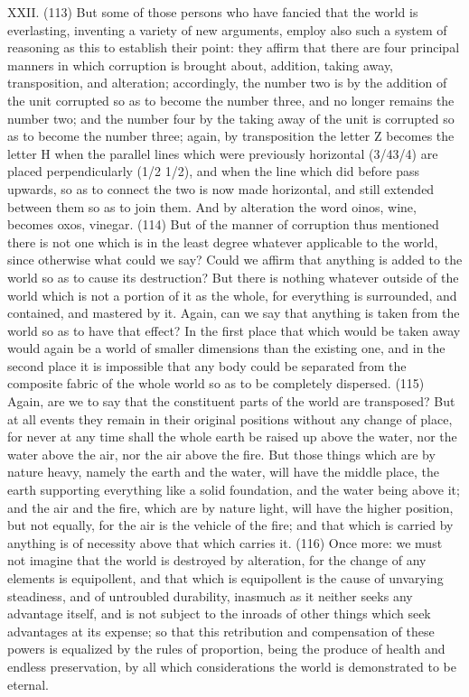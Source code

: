 XXII. (113) But some of those persons who have fancied that the world is everlasting, inventing a
variety of new arguments, employ also such a system of reasoning as this to establish their point:
they affirm that there are four principal manners in which corruption is brought about, addition,
taking away, transposition, and alteration; accordingly, the number two is by the addition of the unit
corrupted so as to become the number three, and no longer remains the number two; and the
number four by the taking away of the unit is corrupted so as to become the number three; again,
by transposition the letter Z becomes the letter H when the parallel lines which were previously
horizontal (3/43/4) are placed perpendicularly (1/2 1/2), and when the line which did before pass
upwards, so as to connect the two is now made horizontal, and still extended between them so as
to join them. And by alteration the word oinos, wine, becomes oxos, vinegar. (114) But of the
manner of corruption thus mentioned there is not one which is in the least degree whatever
applicable to the world, since otherwise what could we say? Could we affirm that anything is added
to the world so as to cause its destruction? But there is nothing whatever outside of the world
which is not a portion of it as the whole, for everything is surrounded, and contained, and mastered
by it. Again, can we say that anything is taken from the world so as to have that effect? In the first
place that which would be taken away would again be a world of smaller dimensions than the
existing one, and in the second place it is impossible that any body could be separated from the
composite fabric of the whole world so as to be completely dispersed. (115) Again, are we to say
that the constituent parts of the world are transposed? But at all events they remain in their original
positions without any change of place, for never at any time shall the whole earth be raised up
above the water, nor the water above the air, nor the air above the fire. But those things which are
by nature heavy, namely the earth and the water, will have the middle place, the earth supporting
everything like a solid foundation, and the water being above it; and the air and the fire, which are
by nature light, will have the higher position, but not equally, for the air is the vehicle of the fire; and
that which is carried by anything is of necessity above that which carries it. (116) Once more: we
must not imagine that the world is destroyed by alteration, for the change of any elements is
equipollent, and that which is equipollent is the cause of unvarying steadiness, and of untroubled
durability, inasmuch as it neither seeks any advantage itself, and is not subject to the inroads of
other things which seek advantages at its expense; so that this retribution and compensation of
these powers is equalized by the rules of proportion, being the produce of health and endless
preservation, by all which considerations the world is demonstrated to be eternal.

